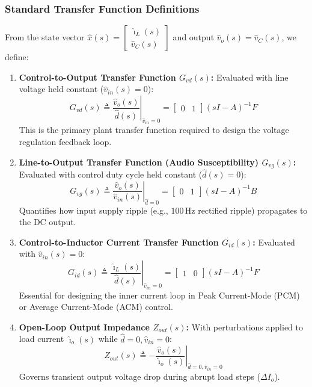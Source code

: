 \subsubsection{Standard Transfer Function Definitions}
From the state vector $\hat{x}(s) = \begin{bmatrix} \hat{\imath}_L(s) \\ \hat{v}_C(s) \end{bmatrix}$ and output $\hat{v}_o(s) = \hat{v}_C(s)$, we define:
\begin{enumerate}
  \item \textbf{Control-to-Output Transfer Function $G_{vd}(s)$:}
  Evaluated with line voltage held constant ($\hat{v}_{in}(s) = 0$):
  \begin{equation}
  \boxed{G_{vd}(s) \triangleq \left.\frac{\hat{v}_o(s)}{\hat{d}(s)}\right|_{\hat{v}_{in}=0} = \begin{bmatrix} 0 & 1 \end{bmatrix} (s I - A)^{-1} F}
  \end{equation}
  This is the primary plant transfer function required to design the voltage regulation feedback loop.

  \item \textbf{Line-to-Output Transfer Function (Audio Susceptibility) $G_{vg}(s)$:}
  Evaluated with control duty cycle held constant ($\hat{d}(s) = 0$):
  \begin{equation}
  \boxed{G_{vg}(s) \triangleq \left.\frac{\hat{v}_o(s)}{\hat{v}_{in}(s)}\right|_{\hat{d}=0} = \begin{bmatrix} 0 & 1 \end{bmatrix} (s I - A)^{-1} B}
  \end{equation}
  Quantifies how input supply ripple (e.g., $100\,\si{\hertz}$ rectified ripple) propagates to the DC output.

  \item \textbf{Control-to-Inductor Current Transfer Function $G_{id}(s)$:}
  Evaluated with $\hat{v}_{in}(s) = 0$:
  \begin{equation}
  \boxed{G_{id}(s) \triangleq \left.\frac{\hat{\imath}_L(s)}{\hat{d}(s)}\right|_{\hat{v}_{in}=0} = \begin{bmatrix} 1 & 0 \end{bmatrix} (s I - A)^{-1} F}
  \end{equation}
  Essential for designing the inner current loop in Peak Current-Mode (PCM) or Average Current-Mode (ACM) control.

  \item \textbf{Open-Loop Output Impedance $Z_{out}(s)$:}
  With perturbations applied to load current $\hat{\imath}_o(s)$ while $\hat{d}=0, \hat{v}_{in}=0$:
  \begin{equation}
  \boxed{Z_{out}(s) \triangleq \left.-\frac{\hat{v}_o(s)}{\hat{\imath}_o(s)}\right|_{\hat{d}=0, \hat{v}_{in}=0}}
  \end{equation}
  Governs transient output voltage drop during abrupt load steps ($\Delta I_o$).
\end{enumerate}

